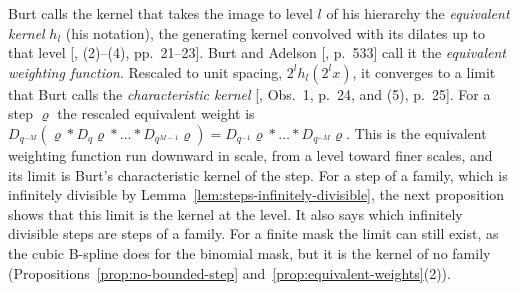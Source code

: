 Burt calls the kernel that takes the image to level $l$ of his hierarchy the \emph{equivalent kernel}
$h_l$ (his notation), the generating kernel convolved with its dilates up to that level
[, (2)--(4), pp.~21--23]. Burt and Adelson
[, p.~533] call it the \emph{equivalent weighting function}. Rescaled to unit spacing, $2^lh_l(2^lx)$, it converges
to a limit that Burt calls the \emph{characteristic kernel} [, Obs.~1, p.~24,
and (5), p.~25]. For a step $\varrho$ the rescaled equivalent weight is
$D_{q^{-M}}(\varrho * D_q\varrho * \dots * D_{q^{M-1}}\varrho) = D_{q^{-1}}\varrho * \dots * D_{q^{-M}}\varrho$.
This is the equivalent weighting function run downward in scale, from a level toward finer scales,
and its limit is Burt's characteristic kernel of the step. For a step of a family, which is infinitely
divisible by Lemma~\ref{lem:steps-infinitely-divisible}, the next proposition shows that this limit is the
kernel at the level. It also says which infinitely divisible steps are steps of a family. For a finite
mask the limit can still exist, as the cubic B-spline does for the binomial mask, but it is the kernel
of no family (Propositions~\ref{prop:no-bounded-step} and~\ref{prop:equivalent-weights}(2)).

